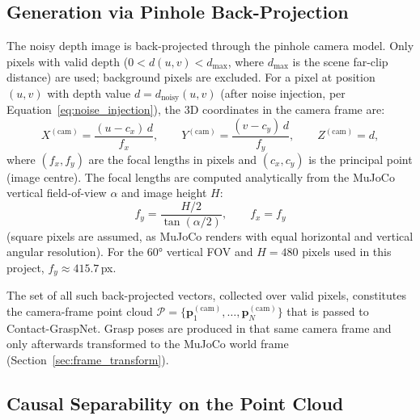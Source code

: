 \documentclass[11pt,a4paper]{report}
\begin{document}
\subsection{Generation via Pinhole Back-Projection}
\label{sec:backprojection}

The noisy depth image is back-projected through the pinhole camera model.
Only pixels with valid depth ($0 < d(u,v) < d_{\max}$, where $d_{\max}$ is the scene far-clip distance) are used; background pixels are excluded. For a pixel at position $(u, v)$ with depth value $d = d_{\text{noisy}}(u, v)$ (after noise injection, per Equation~\eqref{eq:noise_injection}), the 3D coordinates in the camera frame are:
\begin{equation}
  X^{(\text{cam})} = \frac{(u - c_x)\, d}{f_x}, \qquad
  Y^{(\text{cam})} = \frac{(v - c_y)\, d}{f_y}, \qquad
  Z^{(\text{cam})} = d,
  \label{eq:backproject}
\end{equation}
where $(f_x, f_y)$ are the focal lengths in pixels and $(c_x, c_y)$ is the
principal point (image centre).  The focal lengths are computed analytically from
the MuJoCo vertical field-of-view $\alpha$ and image height $H$:
\begin{equation}
  f_y = \frac{H/2}{\tan(\alpha/2)}, \qquad f_x = f_y
  \label{eq:focal_from_fov}
\end{equation}
(square pixels are assumed, as MuJoCo renders with equal horizontal and vertical
angular resolution).  For the 60° vertical FOV and $H = 480$ pixels used in
this project, $f_y \approx 415.7$\,px.

The set of all such back-projected vectors, collected over valid pixels, constitutes
the camera-frame point cloud $\mathcal{P} = \{\mathbf{p}_1^{(\mathrm{cam})}, \ldots, \mathbf{p}_N^{(\mathrm{cam})}\}$
that is passed to Contact-GraspNet. Grasp poses are produced in that same camera frame
and only afterwards transformed to the MuJoCo world frame (Section~\ref{sec:frame_transform}).

\subsection{Causal Separability on the Point Cloud}
\label{sec:pointcloud_justification}
\end{document}
